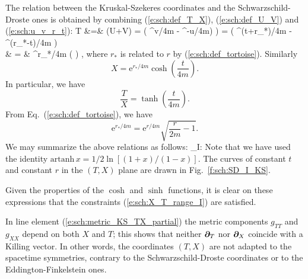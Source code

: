 The relation between the Kruskal-Szekeres coordinates and the
Schwarzschild-Droste ones is obtained by combining (\ref{e:sch:def_T_X}),
(\ref{e:sch:def_U_V}) and (\ref{e:sch:u_v_r_t}):
\bea
    T &=& (U+V) =  \left( ^{v/4m}
        - ^{-u/4m)} \right) =
         \left( ^{(t+r_*)/4m}
        - ^{(r_*-t)/4m} \right) \nonumber \\
     & = & ^{r_*/4m} \sinh\left(  \right) ,\nonumber
\eea
where $r_*$ is related to $r$ by (\ref{e:sch:def_tortoise}).
Similarly
\[
     X = \mathrm{e}^{r_*/4m} \cosh\left( \frac{t}{4m} \right) .
\]
In particular, we have
\[
    \frac{T}{X} = \tanh\left( \frac{t}{4m} \right) .
\]
From Eq.~(\ref{e:sch:def_tortoise}), we have
\[
    \mathrm{e}^{r_*/4m} = \mathrm{e}^{r/4m} \sqrt{ \frac{r}{2m} - 1 } .
\]
We may summarize the above relations as follows:
\be \label{e:sch:KS_SD_I}
    \M_{\rm I}: \quad {}
    \iff
\ee
Note that we have used the identity $\mathrm{artanh}\, x = 1/2 \ln\left[(1+x)/(1-x)\right]$.
The curves of constant $t$ and constant $r$ in the $(T,X)$ plane
are drawn in Fig.~\ref{f:sch:SD_I_KS}.
\begin{remark}
Given the properties of the $\cosh$ and $\sinh$ functions, it is clear on these
expressions that the constraints (\ref{e:sch:X_T_range_I}) are satisfied.
\end{remark}
\begin{remark}
In line element (\ref{e:sch:metric_KS_TX_partial})
the metric components $g_{TT}$ and $g_{XX}$ depend on both $X$ and $T$; this
shows that neither $\bm{\partial}_T$ nor $\bm{\partial}_X$ coincide with a Killing vector.
In other words, the coordinates $(T,X)$ are not adapted to the spacetime
symmetries, contrary to the Schwarzschild-Droste coordinates or to the
Eddington-Finkelstein ones.
\end{remark}

